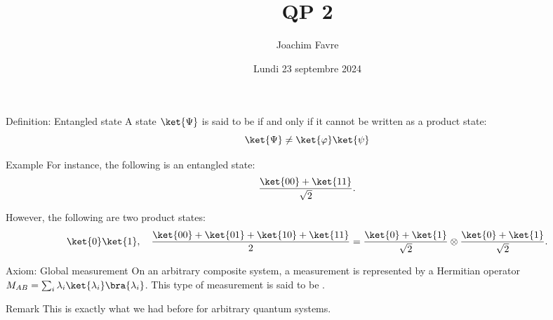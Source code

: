 \documentclass[a4paper]{article}
\title{QP 2}
\author{Joachim Favre}
\date{Lundi 23 septembre 2024}
\begin{document}
\maketitle


\begin{parag}{Definition: Entangled state}
    A state $\ket{\Psi}$ is said to be  if and only if it cannot be written as a product state: 
    \[\ket{\Psi} \neq \ket{\phi} \ket{\psi}\]
   
    \begin{subparag}{Example}
        For instance, the following is an entangled state: 
        \[\frac{\ket{00} + \ket{11}}{\sqrt{2}}.\]
        
        However, the following are two product states: 
        \[\ket{0}\ket{1}, \mathspace \frac{\ket{00} + \ket{01} + \ket{10} + \ket{11}}{2} = \frac{\ket{0} + \ket{1}}{\sqrt{2}} \otimes \frac{\ket{0} + \ket{1}}{\sqrt{2}}.\]
    \end{subparag}
\end{parag}

\begin{parag}{Axiom: Global measurement}
    On an arbitrary composite system, a measurement is represented by a Hermitian operator $M_{AB} = \sum_{i} \lambda_i \ket{\lambda_i} \bra{\lambda_i}$. This type of measurement is said to be .

    \begin{subparag}{Remark}
        This is exactly what we had before for arbitrary quantum systems. 
    \end{subparag}
\end{parag}
\end{document}
